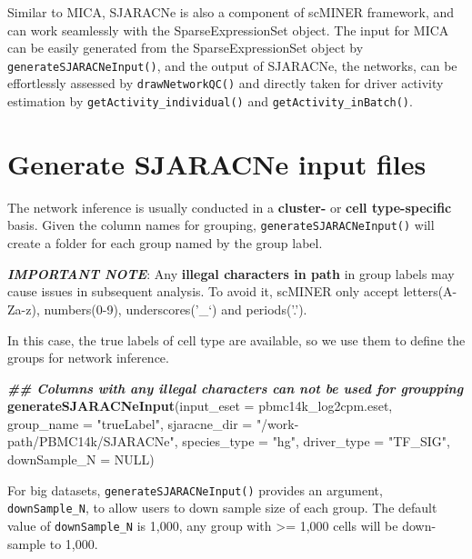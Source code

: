 \documentclass[
  12pt,
]{book}
\newenvironment{Shaded}{\begin{snugshade}}{\end{snugshade}}
\newcommand{\AttributeTok}[1]{\textcolor[rgb]{0.13,0.29,0.53}{#1}}
\newcommand{\ConstantTok}[1]{\textcolor[rgb]{0.56,0.35,0.01}{#1}}
\newcommand{\DocumentationTok}[1]{\textcolor[rgb]{0.56,0.35,0.01}{\textbf{\textit{#1}}}}
\newcommand{\FunctionTok}[1]{\textcolor[rgb]{0.13,0.29,0.53}{\textbf{#1}}}
\newcommand{\NormalTok}[1]{#1}
\newcommand{\StringTok}[1]{\textcolor[rgb]{0.31,0.60,0.02}{#1}}
\begin{document}
Similar to MICA, SJARACNe is also a component of scMINER framework, and can work seamlessly with the SparseExpressionSet object. The input for MICA can be easily generated from the SparseExpressionSet object by \texttt{generateSJARACNeInput()}, and the output of SJARACNe, the networks, can be effortlessly assessed by \texttt{drawNetworkQC()} and directly taken for driver activity estimation by \texttt{getActivity\_individual()} and \texttt{getActivity\_inBatch()}.

\section{Generate SJARACNe input files}\label{generate-sjaracne-input-files}

The network inference is usually conducted in a \textbf{cluster-} or \textbf{cell type-specific} basis. Given the column names for grouping, \texttt{generateSJARACNeInput()} will create a folder for each group named by the group label.

\textbf{\emph{IMPORTANT NOTE}}: Any \textbf{illegal characters in path} in group labels may cause issues in subsequent analysis. To avoid it, scMINER only accept letters(A-Za-z), numbers(0-9), underscores('\_`) and periods('.').

In this case, the true labels of cell type are available, so we use them to define the groups for network inference.

\begin{Shaded}
\begin{Highlighting}[]
\DocumentationTok{\#\# Columns with any illegal characters can not be used for groupping}
\FunctionTok{generateSJARACNeInput}\NormalTok{(}\AttributeTok{input\_eset =}\NormalTok{ pbmc14k\_log2cpm.eset, }\AttributeTok{group\_name =} \StringTok{"trueLabel"}\NormalTok{, }\AttributeTok{sjaracne\_dir =} \StringTok{"/work{-}path/PBMC14k/SJARACNe"}\NormalTok{, }\AttributeTok{species\_type =} \StringTok{"hg"}\NormalTok{, }\AttributeTok{driver\_type =} \StringTok{"TF\_SIG"}\NormalTok{, }\AttributeTok{downSample\_N =} \ConstantTok{NULL}\NormalTok{)}
\end{Highlighting}
\end{Shaded}

For big datasets, \texttt{generateSJARACNeInput()} provides an argument, \texttt{downSample\_N}, to allow users to down sample size of each group. The default value of \texttt{downSample\_N} is 1,000, any group with \textgreater= 1,000 cells will be down-sample to 1,000.
\end{document}
